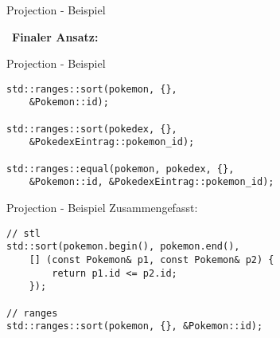 \begin{frame}{Projection - Beispiel}
    \begin{center}
        \SixStar \ \textbf{Finaler Ansatz:} \SixStar
    \end{center}
\end{frame}

\begin{frame}[fragile]{Projection - Beispiel}
    \begin{verbatim}
std::ranges::sort(pokemon, {},
    &Pokemon::id);

std::ranges::sort(pokedex, {},
    &PokedexEintrag::pokemon_id);

std::ranges::equal(pokemon, pokedex, {},
    &Pokemon::id, &PokedexEintrag::pokemon_id);
    \end{verbatim}
\end{frame}

\begin{frame}[fragile]{Projection - Beispiel}
    Zusammengefasst:

    \begin{verbatim}
// stl
std::sort(pokemon.begin(), pokemon.end(),
    [] (const Pokemon& p1, const Pokemon& p2) {
        return p1.id <= p2.id;
    });

// ranges
std::ranges::sort(pokemon, {}, &Pokemon::id);
    \end{verbatim}
\end{frame}